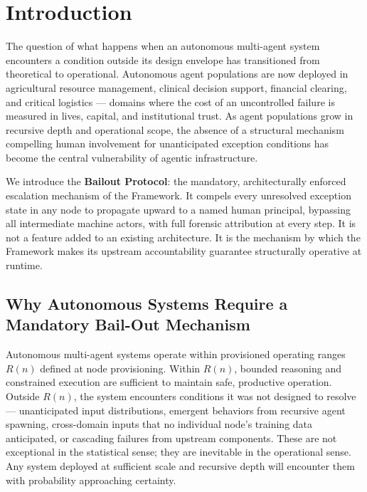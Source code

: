 \section{Introduction}

The question of what happens when an autonomous multi-agent system encounters a condition outside its design envelope has transitioned from theoretical to operational. Autonomous agent populations are now deployed in agricultural resource management, clinical decision support, financial clearing, and critical logistics --- domains where the cost of an uncontrolled failure is measured in lives, capital, and institutional trust. As agent populations grow in recursive depth and operational scope, the absence of a structural mechanism compelling human involvement for unanticipated exception conditions has become the central vulnerability of agentic infrastructure.

We introduce the \textbf{Bailout Protocol}: the mandatory, architecturally enforced escalation mechanism of the \bxthree{} Framework. It compels every unresolved exception state in any \bxthree{} node to propagate upward to a named human principal, bypassing all intermediate machine actors, with full forensic attribution at every step. It is not a feature added to an existing architecture. It is the mechanism by which the \bxthree{} Framework makes its upstream accountability guarantee structurally operative at runtime.

\subsection{Why Autonomous Systems Require a Mandatory Bail-Out Mechanism}

Autonomous multi-agent systems operate within provisioned operating ranges $R(n)$ defined at node provisioning. Within $R(n)$, bounded reasoning and constrained execution are sufficient to maintain safe, productive operation. Outside $R(n)$, the system encounters conditions it was not designed to resolve --- unanticipated input distributions, emergent behaviors from recursive agent spawning, cross-domain inputs that no individual node's training data anticipated, or cascading failures from upstream components. These are not exceptional in the statistical sense; they are inevitable in the operational sense. Any system deployed at sufficient scale and recursive depth will encounter them with probability approaching certainty.

